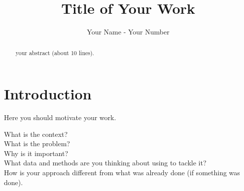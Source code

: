 \documentclass[sigplan]{acmart}
\begin{document}
\title{Title of Your Work}


\author{Your Name - Your Number}


\renewcommand{\shortauthors}{Your Name - Your Number}

\begin{abstract}
  your abstract (about 10 lines).
\end{abstract}




\maketitle

\section{Introduction}

Here you should motivate your work. 

What is the context? \\

What is the problem? \\

Why is it important? \\

What data and methods are you thinking about using to tackle it? \\

How is your approach different from what was already done (if something was done). \\
\end{document}
